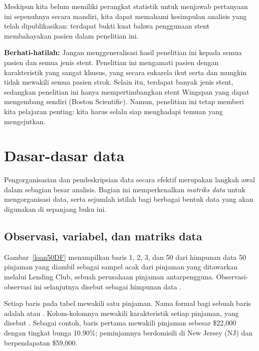 Meskipun kita belum memiliki perangkat statistik untuk menjawab pertanyaan ini sepenuhnya secara mandiri, kita dapat memahami kesimpulan analisis yang telah dipublikasikan: terdapat bukti kuat bahwa penggunaan stent membahayakan pasien dalam penelitian ini.

\textbf{Berhati-hatilah:}
Jangan menggeneralisasi hasil penelitian ini kepada semua pasien
dan semua jenis stent.
Penelitian ini mengamati pasien dengan karakteristik yang sangat khusus,
yang secara sukarela ikut serta dan mungkin tidak
mewakili semua pasien strok.
Selain itu, terdapat banyak jenis stent, sedangkan penelitian ini hanya
mempertimbangkan stent Wingspan yang dapat mengembang sendiri (Boston Scientific).
Namun, penelitian ini tetap memberi kita pelajaran penting:
kita harus selalu siap menghadapi temuan yang mengejutkan.



{}



\section{Dasar-dasar data}
\label{dataBasics}

Pengorganisasian dan pendeskripsian data secara efektif merupakan langkah
awal dalam sebagian besar analisis.
Bagian ini memperkenalkan \emph{matriks data} untuk mengorganisasi data,
serta sejumlah istilah bagi berbagai bentuk data yang akan digunakan
di sepanjang buku ini.

\subsection{Observasi, variabel, dan matriks data}


Gambar~\ref{loan50DF} menampilkan baris 1, 2, 3, dan 50 dari himpunan data
50 pinjaman yang diambil sebagai sampel acak dari pinjaman yang ditawarkan
melalui Lending Club, sebuah perusahaan pinjaman antarpengguna.
Observasi-observasi ini selanjutnya disebut sebagai himpunan data
.

Setiap baris pada tabel mewakili satu pinjaman.
Nama formal bagi sebuah baris adalah 
atau .
Kolom-kolomnya mewakili karakteristik setiap pinjaman,
yang disebut .
Sebagai contoh, baris pertama mewakili pinjaman sebesar \$22,000 dengan tingkat bunga 10.90\%; peminjamnya berdomisili di New Jersey (NJ) dan berpendapatan \$59,000.

